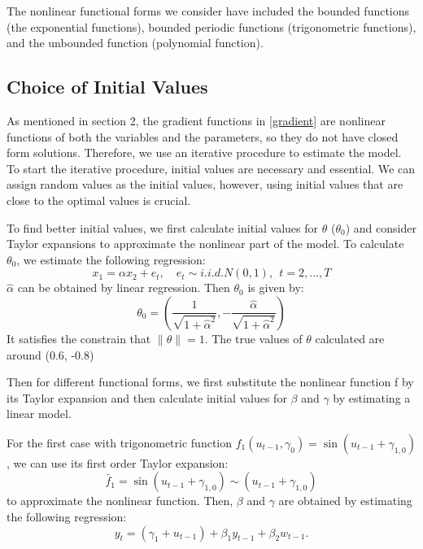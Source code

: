 \documentclass[a4paper,12pt,times,numbered,print,index]{report}
\numberwithin{equation}{section}
\begin{document}
The nonlinear functional forms we consider have included the bounded functions (the exponential functions), bounded periodic functions (trigonometric functions), and the unbounded function (polynomial function). 

\subsection{Choice of Initial Values}

As mentioned in section 2, the gradient functions in \ref{gradient} are nonlinear functions of both the variables and the parameters, so they do not have closed form solutions. Therefore, we use an iterative procedure to estimate the model. To start the iterative procedure, initial values are necessary and essential. We can assign random values as the initial values, however, using initial values that are close to the optimal values is crucial.

To find better initial values, we first calculate initial values for $\theta$ ($\theta_{0}$) and consider Taylor expansions to approximate the nonlinear part of the model. To calculate $\theta_{0}$, we estimate the following regression:
$$
x_1 = \alpha x_2 + e_t, \quad e_{t}\sim i.i.d.N\left( 0,1\right) ,\ \ t=2,...,T
$$
$\hat{\alpha}$ can be obtained by linear regression. Then $\theta_0$ is given by:
$$
\theta_{0} = (\dfrac{1}{\sqrt{1+\hat{\alpha}^2}}, -\dfrac{\hat{\alpha}}{\sqrt{1+\hat{\alpha}^2}})
$$
It satisfies the constrain that $\|\theta\| = 1$. 
The true values of $\theta$ calculated are around (0.6, -0.8)


Then for different functional forms, we first substitute the nonlinear function f by its Taylor expansion and then calculate initial values for $\beta$ and $\gamma$ by estimating a linear model.

For the first case with trigonometric function $f_{1}\left( u_{t-1},\gamma _{0}\right) =\sin \left( u_{t-1}+\gamma_{1,0}\right)$, we can use its first order Taylor expansion: 
$$
\tilde{f_1} = \sin \left( u_{t-1}+\gamma_{1,0}\right) \sim \left( u_{t-1}+\gamma_{1,0}\right) 
$$ 
to approximate the nonlinear function. Then, $\beta$ and $\gamma$ are obtained by estimating the following regression:
$$
y_t = \left( \gamma_{1} + u_{t-1}\right)  + \beta_{1}y_{t-1} + \beta_2w_{t-1}.
$$

\end{document}
